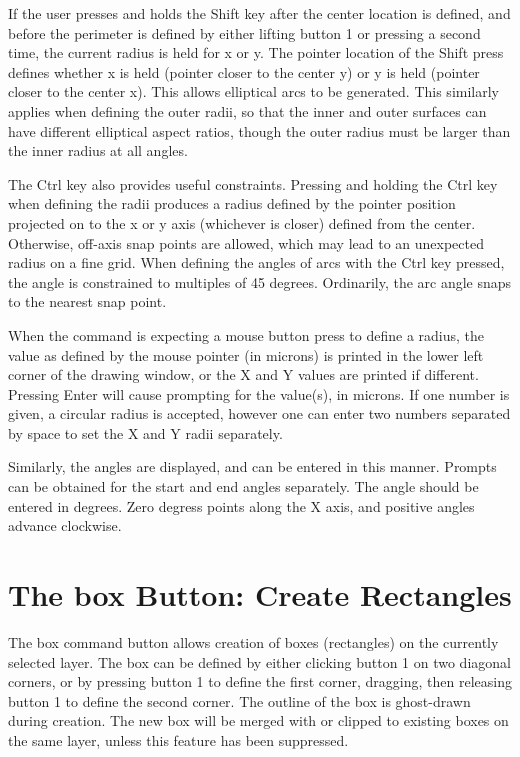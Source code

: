 If the user presses and holds the {\kb Shift} key after the center
location is defined, and before the perimeter is defined by either
lifting button 1 or pressing a second time, the current radius is held
for x or y.  The pointer location of the {\kb Shift} press defines
whether x is held (pointer closer to the center y) or y is held
(pointer closer to the center x).  This allows elliptical arcs to be
generated.  This similarly applies when defining the outer radii, so
that the inner and outer surfaces can have different elliptical aspect
ratios, though the outer radius must be larger than the inner radius
at all angles.

The {\kb Ctrl} key also provides useful constraints.  Pressing and
holding the {\kb Ctrl} key when defining the radii produces a radius
defined by the pointer position projected on to the x or y axis
(whichever is closer) defined from the center.  Otherwise, off-axis
snap points are allowed, which may lead to an unexpected radius on a
fine grid.  When defining the angles of arcs with the {\kb Ctrl} key
pressed, the angle is constrained to multiples of 45 degrees. 
Ordinarily, the arc angle snaps to the nearest snap point.

When the command is expecting a mouse button press to define a radius,
the value as defined by the mouse pointer (in microns) is printed in
the lower left corner of the drawing window, or the X and Y values are
printed if different.  Pressing {\kb Enter} will cause prompting for
the value(s), in microns.  If one number is given, a circular radius
is accepted, however one can enter two numbers separated by space to
set the X and Y radii separately.

Similarly, the angles are displayed, and can be entered in this
manner.  Prompts can be obtained for the start and end angles
separately.  The angle should be entered in degrees.  Zero degress
points along the X axis, and positive angles advance clockwise.


\section{The {\cb box} Button: Create Rectangles}

The {\cb box} command button allows creation of boxes (rectangles) on
the currently selected layer.  The box can be defined by either
clicking button 1 on two diagonal corners, or by pressing button 1 to
define the first corner, dragging, then releasing button 1 to define
the second corner.  The outline of the box is ghost-drawn during
creation.  The new box will be merged with or clipped to existing
boxes on the same layer, unless this feature has been suppressed.

